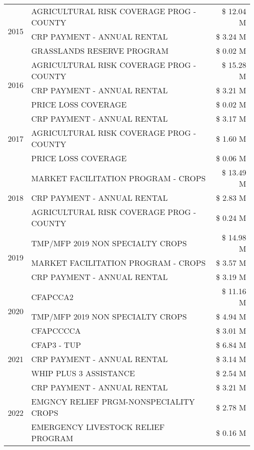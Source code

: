 \begin{tabular}{llr}
\multirow[t]{3}{*}{2015} & AGRICULTURAL RISK COVERAGE PROG - COUNTY & \$ 12.04 M \\
 & CRP PAYMENT - ANNUAL RENTAL & \$ 3.24 M \\
 & GRASSLANDS RESERVE PROGRAM & \$ 0.02 M \\
\cline{1-3}
\multirow[t]{3}{*}{2016} & AGRICULTURAL RISK COVERAGE PROG - COUNTY & \$ 15.28 M \\
 & CRP PAYMENT - ANNUAL RENTAL & \$ 3.21 M \\
 & PRICE LOSS COVERAGE & \$ 0.02 M \\
\cline{1-3}
\multirow[t]{3}{*}{2017} & CRP PAYMENT - ANNUAL RENTAL & \$ 3.17 M \\
 & AGRICULTURAL RISK COVERAGE PROG - COUNTY & \$ 1.60 M \\
 & PRICE LOSS COVERAGE & \$ 0.06 M \\
\cline{1-3}
\multirow[t]{3}{*}{2018} & MARKET FACILITATION PROGRAM - CROPS & \$ 13.49 M \\
 & CRP PAYMENT - ANNUAL RENTAL & \$ 2.83 M \\
 & AGRICULTURAL RISK COVERAGE PROG - COUNTY & \$ 0.24 M \\
\cline{1-3}
\multirow[t]{3}{*}{2019} & TMP/MFP 2019 NON SPECIALTY CROPS & \$ 14.98 M \\
 & MARKET FACILITATION PROGRAM - CROPS & \$ 3.57 M \\
 & CRP PAYMENT - ANNUAL RENTAL & \$ 3.19 M \\
\cline{1-3}
\multirow[t]{3}{*}{2020} & CFAPCCA2 & \$ 11.16 M \\
 & TMP/MFP 2019 NON SPECIALTY CROPS & \$ 4.94 M \\
 & CFAPCCCCA & \$ 3.01 M \\
\cline{1-3}
\multirow[t]{3}{*}{2021} & CFAP3 - TUP & \$ 6.84 M \\
 & CRP PAYMENT - ANNUAL RENTAL & \$ 3.14 M \\
 & WHIP PLUS 3 ASSISTANCE & \$ 2.54 M \\
\cline{1-3}
\multirow[t]{3}{*}{2022} & CRP PAYMENT - ANNUAL RENTAL & \$ 3.21 M \\
 & EMGNCY RELIEF PRGM-NONSPECIALITY CROPS & \$ 2.78 M \\
 & EMERGENCY LIVESTOCK RELIEF PROGRAM & \$ 0.16 M \\
\cline{1-3}
\bottomrule
\end{tabular}
